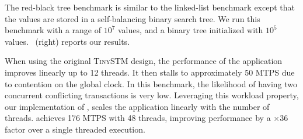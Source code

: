 The red-black tree benchmark is similar to the linked-list benchmark except that the values are stored in a self-balancing binary search tree. 
We run this benchmark with a range of $10^7$ values, and a binary tree initialized with $10^5$ values.
~(right) reports our results.

When using the original \textsc{TinySTM} design, the performance of the application improves linearly up to 12 threads. 
It then stalls to approximately 50 MTPS due to contention on the global clock.
In this benchmark, the likelihood of having two concurrent conflicting transactions is very low.
Leveraging this workload property, our implementation of , scales the application linearly with the number of threads.
 achieves 176 MTPS with 48 threads, improving performance by a $\times 36$ factor over a single threaded execution.


